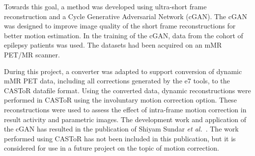 Towards this goal, a method was developed using ultra-short frame reconstruction 
and a Cycle Generative Adversarial Network (cGAN). The cGAN was designed to improve image quality of the short frame reconstructions for better motion estimation. In the training of the cGAN, data from the cohort of epilepsy patients was used. The datasets had been acquired on an mMR PET/MR scanner.

During this project, a converter was adapted to support conversion of dynamic mMR PET data, including all corrections generated by the e7 tools, to the CASToR datafile format. Using the converted data, dynamic reconstructions were performed in CASToR using the involuntary motion correction option. These reconstructions were used to assess the effect of intra-frame motion correction in result activity and parametric images.
The development work and application of the cGAN has resulted in the publication of Shiyam Sundar \textit{et al.}~\cite{ShiyamSundar2020}. The work performed using CASToR has not been included in this publication, but it is considered for use in a future project on the topic of motion correction.

%
%